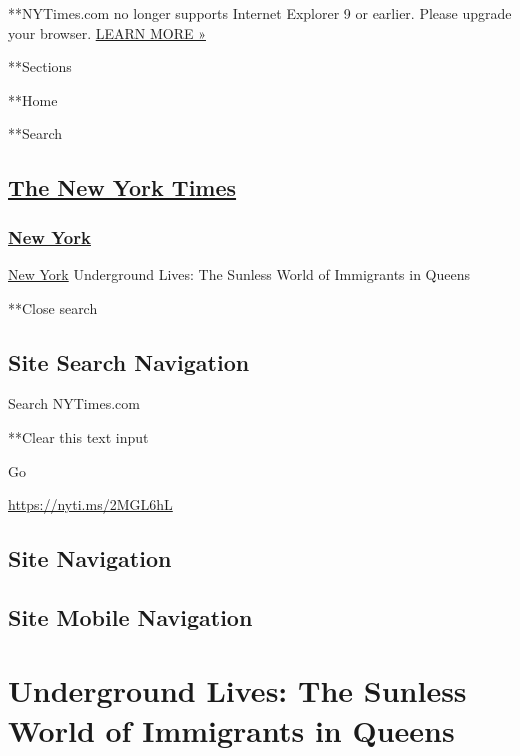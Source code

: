  **NYTimes.com no longer supports Internet Explorer 9 or earlier. Please
upgrade your browser.
\href{http://www.nytimes3xbfgragh.onion/content/help/site/ie9-support.html}{LEARN
MORE »}

**Sections

**Home

**Search

\hypertarget{the-new-york-times}{%
\subsection{\texorpdfstring{\href{http://www.nytimes3xbfgragh.onion/}{The
New York Times}}{The New York Times}}\label{the-new-york-times}}

\hypertarget{-new-york-}{%
\subsubsection{\texorpdfstring{ \href{/section/nyregion}{New York}
}{ New York }}\label{-new-york-}}

 \href{/section/nyregion}{New York} \textbar{}Underground Lives: The
Sunless World of Immigrants in Queens

**Close search

\hypertarget{site-search-navigation}{%
\subsection{Site Search Navigation}\label{site-search-navigation}}

Search NYTimes.com

**Clear this text input

Go

\url{https://nyti.ms/2MGL6hL}

\hypertarget{site-navigation}{%
\subsection{Site Navigation}\label{site-navigation}}

\hypertarget{site-mobile-navigation}{%
\subsection{Site Mobile Navigation}\label{site-mobile-navigation}}

\hypertarget{underground-lives-the-sunless-world-of-immigrants-in-queens}{%
\section{Underground Lives: The Sunless World of Immigrants in
Queens}\label{underground-lives-the-sunless-world-of-immigrants-in-queens}}

